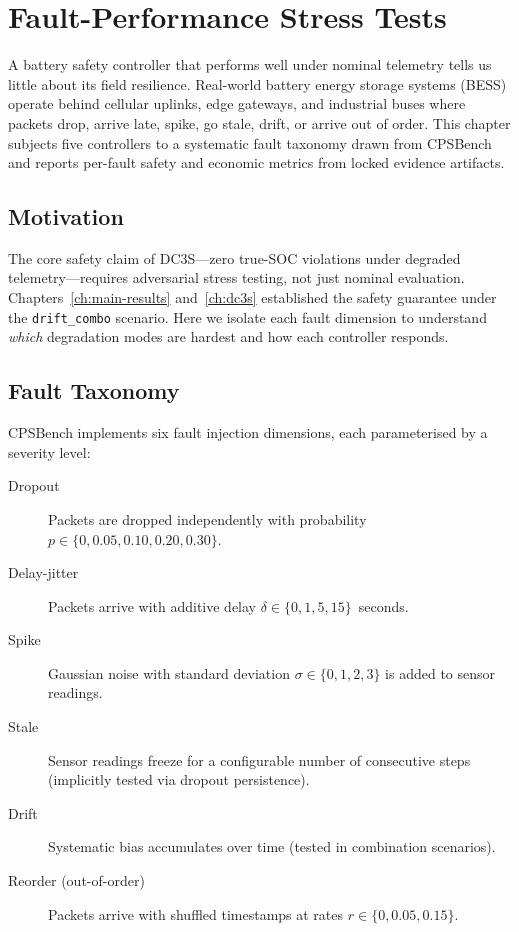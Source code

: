 
\chapter{Fault-Performance Stress Tests}
\label{ch:fault-stress}

A battery safety controller that performs well under nominal telemetry
tells us little about its field resilience.  Real-world battery energy
storage systems (BESS) operate behind cellular uplinks, edge gateways,
and industrial buses where packets drop, arrive late, spike, go stale,
drift, or arrive out of order.  This chapter subjects five controllers
to a systematic fault taxonomy drawn from CPSBench and reports per-fault
safety and economic metrics from locked evidence artifacts.

\section{Motivation}

The core safety claim of DC3S---zero true-SOC violations under degraded
telemetry---requires adversarial stress testing, not just nominal
evaluation.  Chapters~\ref{ch:main-results} and~\ref{ch:dc3s} established
the safety guarantee under the \texttt{drift\_combo} scenario.  Here we
isolate each fault dimension to understand \emph{which} degradation modes
are hardest and how each controller responds.

\section{Fault Taxonomy}

CPSBench implements six fault injection dimensions, each parameterised
by a severity level:

\begin{description}
  \item[Dropout] Packets are dropped independently with probability
    $p \in \{0, 0.05, 0.10, 0.20, 0.30\}$.
  \item[Delay-jitter] Packets arrive with additive delay
    $\delta \in \{0, 1, 5, 15\}$~seconds.
  \item[Spike] Gaussian noise with standard deviation
    $\sigma \in \{0, 1, 2, 3\}$ is added to sensor readings.
  \item[Stale] Sensor readings freeze for a configurable number of
    consecutive steps (implicitly tested via dropout persistence).
  \item[Drift] Systematic bias accumulates over time (tested in
    combination scenarios).
  \item[Reorder (out-of-order)] Packets arrive with shuffled timestamps
    at rates $r \in \{0, 0.05, 0.15\}$.
\end{description}

